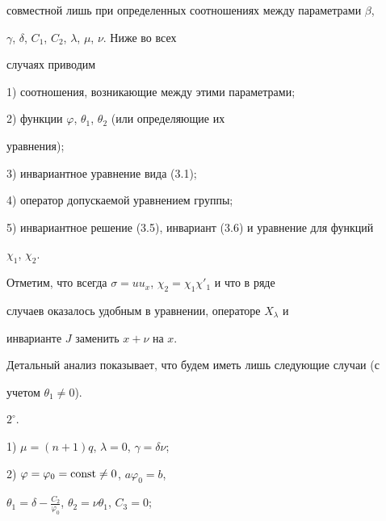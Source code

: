 совместной лишь при определенных соотношениях между параметрами $\beta$, 


$\gamma$, $\delta$, $C_1$, $C_2$, $\lambda$, $\mu$, $\nu$. Ниже во всех 


случаях приводим 


 


1) соотношения, возникающие между этими параметрами; 


 


2) функции $\varphi$, $\theta_1$, $\theta_2$ (или определяющие их 


уравнения); 


 


3) инвариантное уравнение вида (3.1); 


 


4) оператор допускаемой уравнением группы; 


 


5) инвариантное решение (3.5), инвариант (3.6) и уравнение для функций 


$\chi_1$, $\chi_2$. 


 


Отметим, что всегда $\sigma=uu_x$, $\chi_2=\chi_1\chi'_1$ и что в ряде 


случаев оказалось удобным в уравнении, операторе $X_\lambda$ и 


инварианте $J$ заменить $x+\nu$ на $x$. 


 


Детальный анализ показывает, что будем иметь лишь следующие случаи (с 


учетом $\theta_1\ne0$). 


 


\noindent{}$2^\circ$. 


 


1) $\mu=(n+1)q$, $\lambda=0$, $\gamma=\delta\nu$; 


 


2) $\varphi=\varphi_0=\operatorname{const}\ne0$, $a\varphi_0=b$, 


$\theta_1=\delta-\frac{C_2}{\varphi_0}$, $\theta_2=\nu\theta_1$, $C_3=0$; 


